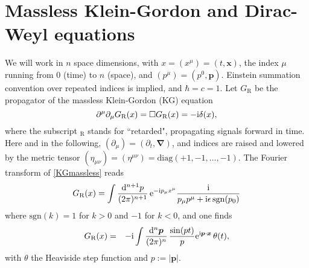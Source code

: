 \section{Massless Klein-Gordon and Dirac-Weyl equations}
\label{massless}
We will work in $n$ space dimensions, with 
 $x=(x^\mu)=(t,\bm x)$, the index $\mu$ running from 0 (time) to $n$ (space), and $(p^\mu)=(p^0,\bm p)$. 
 Einstein summation convention over repeated indices is implied, and $\hbar = c =1$.
Let $G_\textrm{R}$ be the propagator of the massless Klein-Gordon (KG) equation 
\begin{equation}
\label{KGmassless}
\partial^\mu \partial_\mu G_\textrm{R} (x) = \Box G_\textrm{R} (x) = - \mathrm{i} \delta (x) ,
\end{equation}
where the subscript $_\textrm{R}$ stands for ``retarded", propagating signals forward in time. Here and in the following, $(\partial_{\mu})=(\partial_t,\bm{\nabla})$, and indices are raised and lowered by the metric tensor $\left(\eta_{\mu\nu}\right)=\left(\eta^{\mu\nu}\right)=\mathrm{diag}(+1,-1,\dots,-1)$. The Fourier transform of \eqref{KGmassless} reads 
\begin{equation}
\label{propKGR}
G_\textrm{R} (x) = \int \frac{\mathrm{d}^{n+1} p}{(2 \pi)^{n+1}} \, \mathrm{e}^{-\mathrm{i} p_{\mu}  x^{\mu}} \frac{\mathrm{i}}{p_{\mu}p^{\mu} + \mathrm{i} \epsilon \, \mathrm{sgn}(p_0)}
\end{equation} 
where $ \mathrm{sgn}(k)=1$ for $k>0$ and $-1$ for $k<0$, and one finds
\begin{eqnarray}
\label{propKGexpl}
G_\textrm{R} (x)  & = & -\mathrm{i} \int \frac{\mathrm{d}^n {\bm p}}{(2 \pi)^n} \, 
\frac{\sin (p t)}{p} 
 \mathrm{e}^{\mathrm{i} {\bm p} \cdot {\bm x}} \, \theta (t),
\end{eqnarray}
with $\theta$ the Heaviside step function and $p:=|\bm{p}|$.


